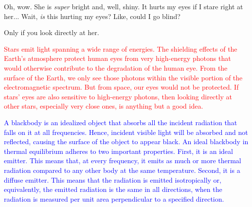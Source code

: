 \documentclass[main.tex]{subfiles}
\begin{document}
\par \Maia Oh, wow.  She is \textit{super} bright and, well, shiny.  It hurts my eyes if I stare right at her... Wait, \textit{is} this hurting my eyes?  Like, could I go blind?

\par \Pleione Only if you look directly at her.

\begin{tcolorbox}[sharp corners, colback=red!30, colframe=red!80!blue, title=Stellar Emission]
\par \textcolor{red} {Stars emit light spanning a wide range of energies.  The shielding effects of the Earth's atmosphere protect human eyes from very high-energy photons that would otherwise contribute to the degradation of the human eye.  From the surface of the Earth, we only see those photons within the visible portion of the electromagnetic spectrum.  But from space, our eyes would not be protected.  If stars' eyes are also sensitive to high-energy photons, then looking directly at other stars, especially very close ones, is anything but a good idea.}
\end{tcolorbox}

\begin{tcolorbox}[sharp corners, colback=blue!30, colframe=blue!80!blue, title=Blackbody]
\par \textcolor{blue} {A blackbody is an idealized object that absorbs all the incident radiation that falls on it at all frequencies.  Hence, incident visible light will be absorbed and not reflected, causing the surface of the object to appear black.  An ideal blackbody in thermal equilibrium adheres to two important properties.  First, it is an ideal emitter.  This means that, at every frequency, it emits as much or more thermal radiation compared to any other body at the same temperature.  Second, it is a diffuse emitter.  This means that the radiation is emitted isotropically or, equivalently, the emitted radiation is the same in all directions, when the radiation is measured per unit area perpendicular to a specified direction.}
\end{tcolorbox}
\end{document}
